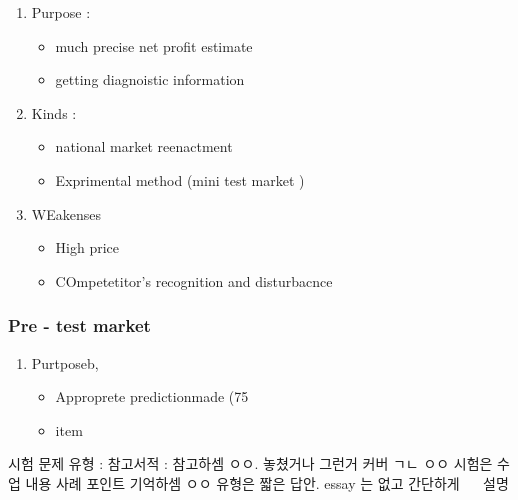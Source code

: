 \documentclass[12pt]{article}
\begin{document}
\begin{enumerate}
	\item Purpose : \begin{itemize}
		\item much precise net profit estimate
		\item getting diagnoistic information
	\end{itemize}
	\item Kinds : \begin{itemize}
		\item national market reenactment
		\item Exprimental method (mini test market )
	\end{itemize}
	\item WEakenses \begin{itemize}
		\item High price
		\item COmpetetitor's recognition and disturbacnce
	\end{itemize}
\end{enumerate}

\subsubsection{Pre - test market}

\begin{enumerate}
	\item Purtposeb, \begin{itemize}
		\item Approprete predictionmade (75%
		\item item
	\end{itemize}
\end{enumerate}




시험 문제 유형 : 참고서적 : 참고하셈 ㅇㅇ. 놓쳤거나 그런거 커버 ㄱㄴ ㅇㅇ
시험은 수업 내용 사례 포인트 기억하셈 ㅇㅇ 유형은 짧은 답안.
essay 는 없고 간단하게 ~~ 설명
\end{document}
